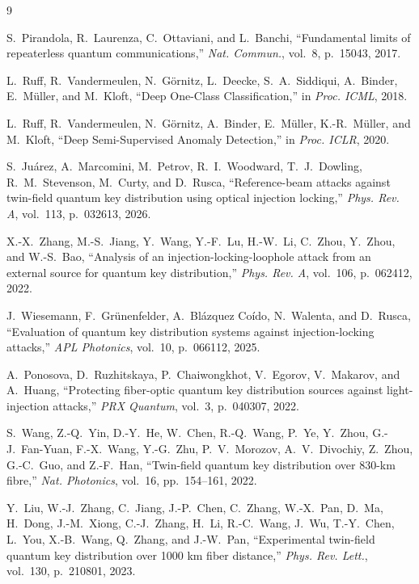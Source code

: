 \documentclass[12pt, a4paper]{report}
\begin{document}
\begin{thebibliography}{9}
 
S.~Pirandola, R.~Laurenza, C.~Ottaviani, and L.~Banchi,
``Fundamental limits of repeaterless quantum communications,''
\textit{Nat. Commun.}, vol.~8, p.~15043, 2017.
 
L.~Ruff, R.~Vandermeulen, N.~G\"ornitz, L.~Deecke, S.~A.~Siddiqui, A.~Binder,
E.~M\"uller, and M.~Kloft,
``Deep One-Class Classification,''
in \textit{Proc. ICML}, 2018.
 
L.~Ruff, R.~Vandermeulen, N.~G\"ornitz, A.~Binder, E.~M\"uller, K.-R.~M\"uller, and M.~Kloft,
``Deep Semi-Supervised Anomaly Detection,''
in \textit{Proc. ICLR}, 2020.
 
S.~Ju\'arez, A.~Marcomini, M.~Petrov, R.~I.~Woodward, T.~J.~Dowling, R.~M.~Stevenson, M.~Curty, and D.~Rusca,
``Reference-beam attacks against twin-field quantum key distribution using optical injection locking,''
\textit{Phys. Rev. A}, vol.~113, p.~032613, 2026.
 
X.-X.~Zhang, M.-S.~Jiang, Y.~Wang, Y.-F.~Lu, H.-W.~Li, C.~Zhou, Y.~Zhou, and W.-S.~Bao,
``Analysis of an injection-locking-loophole attack from an external source for quantum key distribution,''
\textit{Phys. Rev. A}, vol.~106, p.~062412, 2022.
 
J.~Wiesemann, F.~Gr\"unenfelder, A.~Bl\'azquez Co\'ido, N.~Walenta, and D.~Rusca,
``Evaluation of quantum key distribution systems against injection-locking attacks,''
\textit{APL Photonics}, vol.~10, p.~066112, 2025.
 
A.~Ponosova, D.~Ruzhitskaya, P.~Chaiwongkhot, V.~Egorov, V.~Makarov, and A.~Huang,
``Protecting fiber-optic quantum key distribution sources against light-injection attacks,''
\textit{PRX Quantum}, vol.~3, p.~040307, 2022.
 
S.~Wang, Z.-Q.~Yin, D.-Y.~He, W.~Chen, R.-Q.~Wang, P.~Ye, Y.~Zhou, G.-J.~Fan-Yuan, F.-X.~Wang, Y.-G.~Zhu, P.~V.~Morozov, A.~V.~Divochiy, Z.~Zhou, G.-C.~Guo, and Z.-F.~Han,
``Twin-field quantum key distribution over 830-km fibre,''
\textit{Nat. Photonics}, vol.~16, pp.~154--161, 2022.
 
Y.~Liu, W.-J.~Zhang, C.~Jiang, J.-P.~Chen, C.~Zhang, W.-X.~Pan, D.~Ma, H.~Dong, J.-M.~Xiong, C.-J.~Zhang, H.~Li, R.-C.~Wang, J.~Wu, T.-Y.~Chen, L.~You, X.-B.~Wang, Q.~Zhang, and J.-W.~Pan,
``Experimental twin-field quantum key distribution over 1000 km fiber distance,''
\textit{Phys. Rev. Lett.}, vol.~130, p.~210801, 2023.
 

\end{thebibliography}
\end{document}
